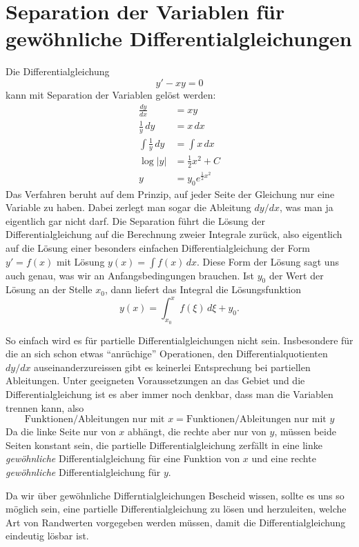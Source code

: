 \section{Separation der Variablen für gewöhnliche Differentialgleichungen}
Die Differentialgleichung 
\begin{equation}
y'-xy=0
\label{separation:ode}
\end{equation}
kann mit Separation der Variablen gelöst werden:
\begin{align*}
\frac{dy}{dx}&=xy\\
\frac1y\,dy&=x\,dx\\
\int\frac1y\,dy&=\int x\,dx\\
\log|y|&=\frac12x^2+C\\
y&=y_0e^{\frac12x^2}
\end{align*}
Das Verfahren beruht auf dem Prinzip, auf jeder Seite der Gleichung
nur eine Variable zu haben.
Dabei zerlegt man sogar die Ableitung $dy/dx$, was man ja eigentlich
gar nicht darf.
Die Separation führt die Lösung der Differentialgleichung auf die
Berechnung zweier Integrale zurück, also eigentlich auf die
Lösung einer besonders einfachen Differentialgleichung der Form $y'=f(x)$
mit Lösung $y(x)=\int f(x)\,dx$.
Diese Form der Lösung sagt uns auch genau, was wir an Anfangsbedingungen
brauchen.
Ist $y_0$ der Wert der Lösung an der Stelle $x_0$, dann liefert
das Integral die Lösungsfunktion
\[
y(x)=\int_{x_0}^xf(\xi)\,d\xi + y_0.
\]

So einfach wird es für partielle Differentialgleichungen nicht sein.
Insbesondere für die an sich schon etwas ``anrüchige'' Operationen,
den Differentialquotienten $dy/dx$ auseinanderzureissen gibt es keinerlei
Entsprechung bei partiellen Ableitungen.
Unter geeigneten Voraussetzungen an das Gebiet und die Differentialgleichung
ist es aber immer noch denkbar, dass man die Variablen trennen kann,
also 
\[
\text{Funktionen/Ableitungen nur mit $x$} = \text{Funktionen/Ableitungen nur mit $y$}
\]
Da die linke Seite nur von $x$ abhängt, die rechte aber nur von $y$, müssen
beide Seiten konstant sein, die partielle Differentialgleichung zerfällt
in eine linke {\em gewöhnliche} Differentialgleichung für eine Funktion von
$x$ und eine rechte {\em gewöhnliche} Differentialgleichung für $y$.

Da wir über gewöhnliche Differntialgleichungen Bescheid wissen, sollte
es uns so möglich sein, eine partielle Differentialgleichung zu lösen
und herzuleiten, welche Art von Randwerten vorgegeben werden müssen, damit
die Differentialgleichung eindeutig lösbar ist.

